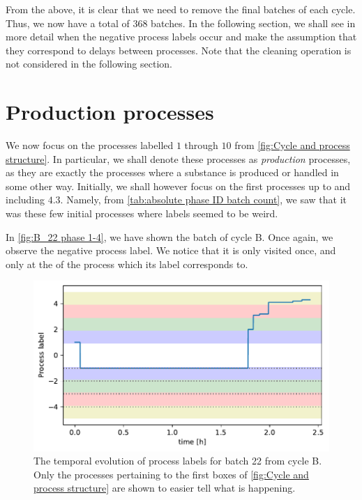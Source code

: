 \documentclass[../Thesis.tex]{subfiles}
\begin{document}
From the above, it is clear that we need to remove the final batches of each cycle. Thus, we now have a total of $368$ batches. In the following section, we shall see in more detail when the negative process labels occur and make the assumption that they correspond to delays between processes. Note that the cleaning operation is not considered in the following section.






\section{Production processes}\label{sec:Data - production processes}
We now focus on the processes labelled $1$ through $10$ from \autoref{fig:Cycle and process structure}. In particular, we shall denote these processes as \textit{production} processes, as they are exactly the processes where a substance is produced or handled in some other way. Initially, we shall however focus on the first processes up to and including $4.3$. Namely, from \autoref{tab:absolute phase ID batch count}, we saw that it was these few initial processes where labels seemed to be weird.

In \autoref{fig:B_22 phase 1-4}, we have shown the  batch of cycle B. Once again, we observe the negative process label. We notice that it is only visited once, and only at the of the process which its label corresponds to.

\begin{figure}[ht]
    \centering
    \includegraphics[width=.83\linewidth]{figures/Multiple cycles data/Adding of solids/B_22 long waiting.pdf}
    \caption{The temporal evolution of process labels for batch 22 from cycle B. Only the processes pertaining to the first boxes of \autoref{fig:Cycle and process structure} are shown to easier tell what is happening.}
    \label{fig:B_22 phase 1-4}
\end{figure}
\end{document}
